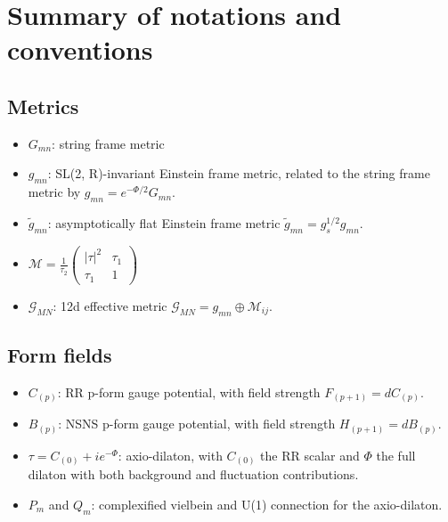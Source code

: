 \section{Summary of notations and conventions}
\subsection{Metrics}
\begin{itemize}
    \item $G_{mn}$: string frame metric
    \item $g_{mn}$: SL(2, R)-invariant Einstein frame metric, related to the string frame metric by $g_{mn} = e^{-\Phi/2}G_{mn}$.
    \item $\tilde{g}_{mn}$: asymptotically flat Einstein frame metric $\tilde{g}_{mn} = g_s^{1/2}g_{mn}$.
    \item $\mathcal{M} = \frac{1}{\tau_2}\begin{pmatrix}
        |\tau|^2 & \tau_1\\
        \tau_1 & 1
    \end{pmatrix}$
    \item $\mathcal{G}_{MN}$: 12d effective metric $\mathcal{G}_{MN} = g_{mn} \oplus \mathcal{M}_{ij}$.
\end{itemize}

\subsection{Form fields}

\begin{itemize}
    \item $C_{(p)}$: RR p-form gauge potential, with field strength $F_{(p+1)} = dC_{(p)}$.
    \item $B_{(p)}$: NSNS p-form gauge potential, with field strength $H_{(p+1)} = dB_{(p)}$.
    \item $\tau = C_{(0)} + ie^{-\Phi}$: axio-dilaton, with $C_{(0)}$ the RR scalar and $\Phi$ the full dilaton with both background and fluctuation contributions.
\end{itemize}

\begin{itemize}
    \item $P_m$ and $Q_m$: complexified vielbein and U(1) connection for the axio-dilaton.
\end{itemize}

